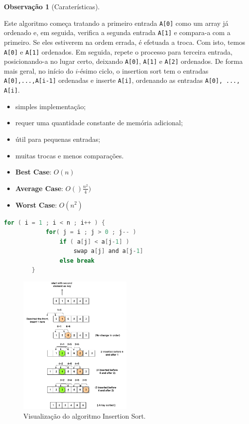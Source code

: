 \documentclass[a4paper, 12pt]{article}
\newtheorem{remark}{Observação}
\begin{document}
\begin{remark}[Caraterísticas]\end{remark}
    Este algoritmo começa tratando  a primeiro entrada \texttt{A[0]} como um array já ordenado e, em seguida, verifica a segunda entrada \texttt{A[1]} e compara-a com
a primeiro. Se eles estiverem na ordem errada, é efetuada a troca. Com isto, temos \texttt{A[0]} e \texttt{A[1]} ordenados.
Em seguida, repete o processo para terceira entrada, posicionando-a no lugar certo, deixando \texttt{A[0]}, \texttt{A[1]} e \texttt{A[2]} ordenados. De forma mais geral, no início do $i$-ésimo ciclo, o insertion sort tem o
entradas \texttt{A[0],...,\texttt{A[i-1]}} ordenadas e inserte \texttt{A[i]}, ordenando as entradas \texttt{A[0], ..., \texttt{A[i]}}.
    \begin{itemize}
        \item simples implementação;
        \item requer uma quantidade constante de memória adicional;
        \item útil para pequenas entradas;
        \item muitas trocas e menos comparações.
        \item \textbf{Best Case}: $O(n)$
        \item \textbf{Average Case}: $O()\frac{n^2}{4})$
        \item \textbf{Worst Case}: $O(n^2)$
    \end{itemize}


\begin{center}
    \begin{lstlisting}[frame=single, language=c, caption=Algoritmo Insertion Sort, captionpos=b]
        for ( i = 1 ; i < n ; i++ ) {
            for( j = i ; j > 0 ; j-- )
                if ( a[j] < a[j-1] )
                    swap a[j] and a[j-1]
                else break
        }            
    \end{lstlisting}

    \begin{figure}[h]
        \centering
        \includegraphics[width=0.5\textwidth]{fig/ao/is.png}
        \caption{Visualização do algoritmo Insertion Sort.}
    \end{figure}
\end{center}
\end{document}
